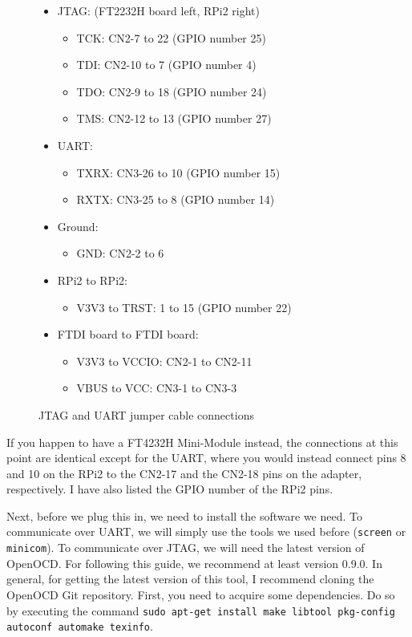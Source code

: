 \documentclass[a4paper,11pt,reqno]{amsart}
\begin{document}
\begin{figure}[hb]
\begin{center}
\begin{itemize}
	\item JTAG: (FT2232H board left, RPi2 right)
		\begin{itemize}
		\item TCK:   CN2-7   to 22 (GPIO number 25)
		\item TDI:   CN2-10  to 7 (GPIO number 4)
		\item TDO:   CN2-9   to 18 (GPIO number 24)
		\item TMS:   CN2-12  to 13 (GPIO number 27)
		\end{itemize}
	\item UART:
		\begin{itemize}
		\item TXRX:  CN3-26  to 10 (GPIO number 15)
		\item RXTX:  CN3-25  to 8 (GPIO number 14)
		\end{itemize}
	\item Ground:
		\begin{itemize}
		\item GND:   CN2-2   to 6
		\end{itemize}
	\item RPi2 to RPi2:
		\begin{itemize}
		\item V3V3 to TRST:  1    to 15 (GPIO number 22)
		\end{itemize}
	\item FTDI board to FTDI board:
		\begin{itemize}
		\item V3V3 to VCCIO: CN2-1   to CN2-11
		\item VBUS to VCC:   CN3-1   to CN3-3
		\end{itemize}
\end{itemize}
\end{center}
\caption{JTAG and UART jumper cable connections}
\label{fig:con1}
\end{figure}

If you happen to have a FT4232H Mini-Module instead, the connections at this point are identical except for the UART, where you would instead connect pins 8 and 10 on the RPi2 to the CN2-17 and the CN2-18 pins on the adapter, respectively. I have also listed the GPIO number of the RPi2 pins.

Next, before we plug this in, we need to install the software we need. To communicate over UART, we will simply use the tools we used before (\texttt{screen} or \texttt{minicom}). To communicate over JTAG, we will need the latest version of OpenOCD. For following this guide, we recommend at least version 0.9.0. In general, for getting the latest version of this tool, I recommend cloning the OpenOCD Git repository. First, you need to acquire some dependencies. Do so by executing the command \texttt{sudo apt-get install make libtool pkg-config autoconf automake texinfo}.
\end{document}
